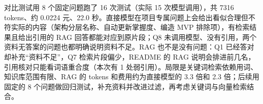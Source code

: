 \documentclass[UTF8,12pt,a4paper]{ctexart}
\begin{document}
对比测试用 8 个固定问题跑了 16 次测试（实际 15 次模型调用），共 7316 tokens、约 0.0224 元、22.0 秒。直接模型在项目专属问题上会给出看似合理但不符实际的内容（架构分层名称、自动更新掌握度、编造 MVP 排除项），有检索结果且给出引用的 RAG 回答都能对应到原片段；Q8 未调用模型、没有引用，两个资料无答案的问题也都明确说明资料不足。RAG 也不是没有问题：Q1 已经答对却补充“资料不足”，Q7 检索片段偏少，README 的 RAG 说明会排进前几名，引用核对只能看词语重合度（本次有 1 处弱引用）。局限是关键词检索依赖用词、知识库范围有限、RAG 的 tokens 和费用约为直接模型的 3.3 倍和 2.3 倍；后续用固定的 8 个问题做回归测试，补充资料并改进过滤，再考虑关键词与向量检索结合。
\end{document}
